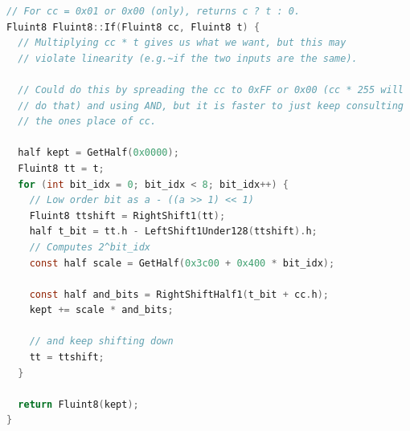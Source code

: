 \documentclass[twocolumn]{article}
\begin{document}

\begin{lstlisting}[language=C]
  // For cc = 0x01 or 0x00 (only), returns c ? t : 0.
Fluint8 Fluint8::If(Fluint8 cc, Fluint8 t) {
  // Multiplying cc * t gives us what we want, but this may
  // violate linearity (e.g.~if the two inputs are the same).

  // Could do this by spreading the cc to 0xFF or 0x00 (cc * 255 will
  // do that) and using AND, but it is faster to just keep consulting
  // the ones place of cc.

  half kept = GetHalf(0x0000);
  Fluint8 tt = t;
  for (int bit_idx = 0; bit_idx < 8; bit_idx++) {
    // Low order bit as a - ((a >> 1) << 1)
    Fluint8 ttshift = RightShift1(tt);
    half t_bit = tt.h - LeftShift1Under128(ttshift).h;
    // Computes 2^bit_idx
    const half scale = GetHalf(0x3c00 + 0x400 * bit_idx);

    const half and_bits = RightShiftHalf1(t_bit + cc.h);
    kept += scale * and_bits;

    // and keep shifting down
    tt = ttshift;
  }

  return Fluint8(kept);
}
\end{lstlisting}

{}

\end{document}

